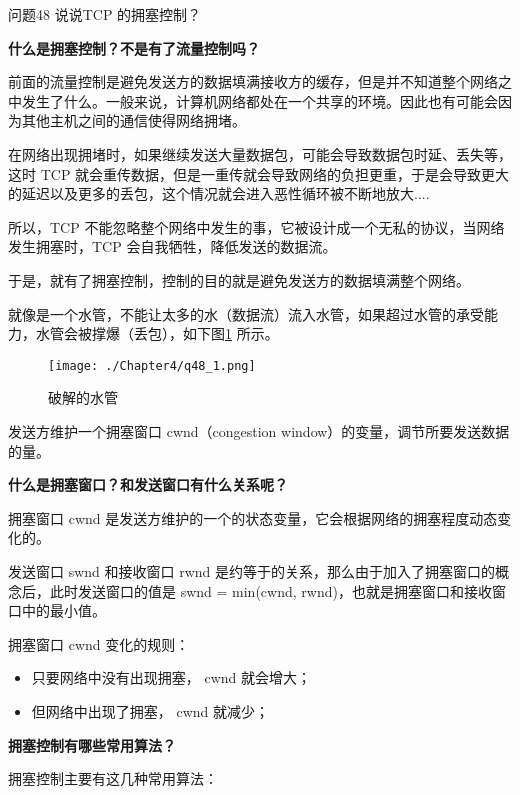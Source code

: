 \documentclass[cn,11pt,color=blue,lang=cn]{elegantbook}
\begin{document}
\begin{custom}{问题48}
说说TCP 的拥塞控制？
\end{custom}
\begin{solution}
\begin{note} \textbf{什么是拥塞控制？不是有了流量控制吗？} \end{note}
前面的流量控制是避免发送方的数据填满接收方的缓存，但是并不知道整个网络之中发生了什么。一般来说，计算机网络都处在一个共享的环境。因此也有可能会因为其他主机之间的通信使得网络拥堵。

在网络出现拥堵时，如果继续发送大量数据包，可能会导致数据包时延、丢失等，这时 TCP 就会重传数据，但是一重传就会导致网络的负担更重，于是会导致更大的延迟以及更多的丢包，这个情况就会进入恶性循环被不断地放大....

所以，TCP 不能忽略整个网络中发生的事，它被设计成一个无私的协议，当网络发生拥塞时，TCP 会自我牺牲，降低发送的数据流。

于是，就有了拥塞控制，控制的目的就是避免发送方的数据填满整个网络。

就像是一个水管，不能让太多的水（数据流）流入水管，如果超过水管的承受能力，水管会被撑爆（丢包），如下图\ref{fig48_1} 所示。
\begin{figure}[htbp]
\centering
\texttt{[image: ./Chapter4/q48\_1.png]}
\caption{破解的水管}
\label{fig48_1}
\end{figure}

发送方维护一个拥塞窗口 cwnd（congestion window）的变量，调节所要发送数据的量。

\begin{note} \textbf{什么是拥塞窗口？和发送窗口有什么关系呢？} \end{note}
拥塞窗口 cwnd 是发送方维护的一个的状态变量，它会根据网络的拥塞程度动态变化的。

发送窗口 swnd 和接收窗口 rwnd 是约等于的关系，那么由于加入了拥塞窗口的概念后，此时发送窗口的值是 swnd = min(cwnd, rwnd)，也就是拥塞窗口和接收窗口中的最小值。

拥塞窗口 cwnd 变化的规则：
\begin{itemize}
	\item 只要网络中没有出现拥塞， cwnd 就会增大；
	\item 但网络中出现了拥塞， cwnd 就减少；
\end{itemize}

\begin{note} \textbf{拥塞控制有哪些常用算法？} \end{note}
拥塞控制主要有这几种常用算法：


\end{solution}
\end{document}
